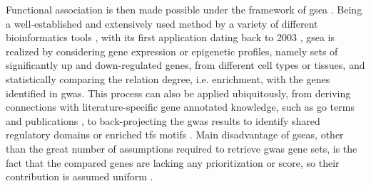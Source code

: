 Functional association is then made possible under the framework of \ac{gsea} \cite{Subramanian2005}. Being a well-established and extensively used method by a variety of different bioinformatics tools \cite{Chen2013,Watanabe2017,Liao2019}, with its first application dating back to 2003 \cite{Mootha2003}, \ac{gsea} is realized by considering gene expression or epigenetic profiles, namely sets of significantly up and down-regulated genes, from different cell types or tissues, and statistically comparing the relation degree, i.e. enrichment, with the genes identified in \ac{gwas}. This process can also be applied ubiquitously, from deriving connections with literature-specific gene annotated knowledge, such as \ac{go} terms \cite{Ashburner2000} and publications \cite{Szklarczyk2021}, to back-projecting the \ac{gwas} results to identify shared regulatory domains \cite{Janky2014} or enriched \acp{tf} motifs \cite{Heinz2010}. Main disadvantage of \acp{gsea}, other than the great number of assumptions required to retrieve \ac{gwas} gene sets, is the fact that the compared genes are lacking any prioritization or score, so their contribution is assumed uniform \cite{Wang2011}.


